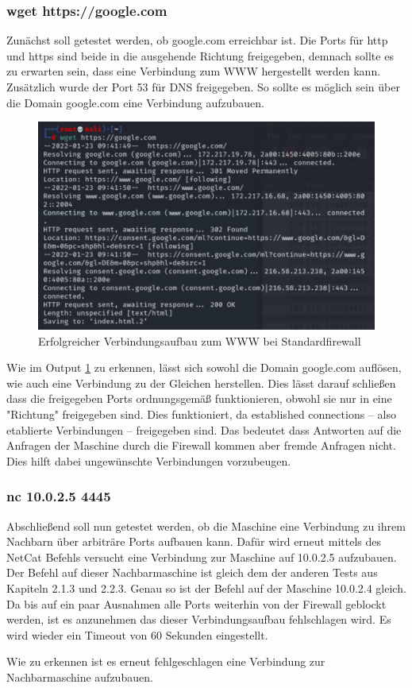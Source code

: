 \subsubsection*{wget https://google.com}
Zunächst soll getestet werden, ob google.com erreichbar ist. Die Ports für http und https sind beide in die ausgehende Richtung freigegeben, demnach sollte es zu erwarten sein, dass eine Verbindung zum WWW hergestellt werden kann. Zusätzlich wurde der Port 53 für DNS freigegeben. So sollte es möglich sein über die Domain google.com eine Verbindung aufzubauen. 
\begin{figure}
	\includegraphics[width=\linewidth]{img/standard_in_out_output.png}
	\caption{Erfolgreicher Verbindungsaufbau zum WWW bei Standardfirewall}
	\label{fig:standard_in_out}
\end{figure}

Wie im Output \ref{fig:standard_in_out} zu erkennen, lässt sich sowohl die Domain google.com auflösen, wie auch eine Verbindung zu der Gleichen herstellen. Dies lässt darauf schließen dass die freigegeben Ports ordnungsgemäß funktionieren, obwohl sie nur in eine "Richtung" freigegeben sind. Dies funktioniert, da established connections – also etablierte Verbindungen – freigegeben sind. Das bedeutet dass Antworten auf die Anfragen der Maschine durch die Firewall kommen aber fremde Anfragen nicht. Dies hilft dabei ungewünschte Verbindungen vorzubeugen.

\subsubsection*{nc 10.0.2.5 4445}
Abschließend soll nun getestet werden, ob die Maschine eine Verbindung zu ihrem Nachbarn über arbiträre Ports aufbauen kann. Dafür wird erneut mittels des NetCat Befehls versucht eine Verbindung zur Maschine auf 10.0.2.5 aufzubauen. 
Der Befehl auf dieser Nachbarmaschine ist gleich dem der anderen Tests aus Kapiteln 2.1.3 und 2.2.3. Genau so ist der Befehl auf der Maschine 10.0.2.4 gleich. Da bis auf ein paar Ausnahmen alle Ports weiterhin von der Firewall geblockt werden, ist es anzunehmen das dieser Verbindungsaufbau fehlschlagen wird. Es wird wieder ein Timeout von 60 Sekunden eingestellt. 



Wie zu erkennen ist es erneut fehlgeschlagen eine Verbindung zur Nachbarmaschine aufzubauen. 
